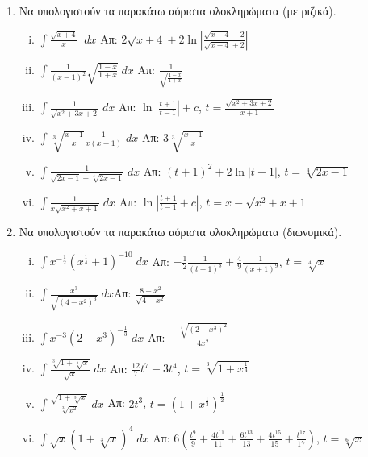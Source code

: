 



\pagestyle{askhseis}
\everymath{\displaystyle}




\begin{center}
  \minibox{\large\bfseries \textcolor{Col1}{Αόριστα Ολοκληρώματα}}
\end{center}

\vspace{\baselineskip}

\begin{enumerate}
\item Να υπολογιστούν τα παρακάτω αόριστα ολοκληρώματα (με ριζικά).
  \begin{enumerate}[i)]
\item $\int\frac{\sqrt{x+4}}{x} \; \; dx$
  \hfill Απ: $2\sqrt{x+4}+2\ln\left|\frac{\sqrt{x+4}-2}{\sqrt{x+4}+2}\right|$
\item $\int\frac{1}{(x-1)^2}\sqrt{\frac{1-x}{1+x}}\; dx$
  \hfill Απ: $\frac{1}{\sqrt{\frac{1-x}{1+x}}}$
\item $\int\frac{1}{\sqrt{x^2+3x+2}}\; dx$
  \hfill Απ: $\ln\left|\frac{t+1}{t-1}\right|+c$, \; $t=\frac{\sqrt{x^2+3x+2}}{x+1}$
\item $\int\sqrt[3]{\frac{x-1}{x}}\frac{1}{x(x-1)}\; dx$
  \hfill Απ: $3\sqrt[3]{\frac{x-1}{x}} $
\item $\int\frac{1}{\sqrt{2x-1}-\sqrt[4]{2x-1}}\; dx$
  \hfill Απ: $(t+1)^2 +2\ln|t-1|$, \; $t=\sqrt[4]{2x-1}$
\item $\int\frac{1}{x\sqrt{x^2+x+1}}\; dx$
  \hfill Απ: $\ln\left|\frac{t+1}{t-1}+c\right|$, \; $t=x-\sqrt{x^2+x+1}$
\end{enumerate}

\item Να υπολογιστούν τα παρακάτω αόριστα ολοκληρώματα (διωνυμικά).
  \begin{enumerate}[i)]
\item $\int x^{-\frac{1}{2}}(x^{\frac{1}{4}}+1)^{-10}\; dx$
  \hfill Απ: $-\frac{1}{2}\frac{1}{(t+1)^8}+\frac{4}{9}\frac{1}{(x+1)^9}$, \; 
  $t=\sqrt[4]{x}$
\item $\int\frac{x^{3}}{\sqrt{(4-x^2)^3}}\; dx$\hfill Απ: $\frac{8-x^2}{\sqrt{4-x^2}}$
\item $\int x^{-3}(2-x^3)^{-\frac{1}{3}} \; dx$
  \hfill Απ: $-\frac{\sqrt[3]{(2-x^3)^2}}{4x^2} $
\item $\int\frac{\sqrt[3]{1+\sqrt[4]{x}}}{\sqrt{x}}\; dx$
  \hfill Απ: $\frac{12}{7}t^7-3t^4$, \; $t=\sqrt[3]{1+x^{\frac{1}{4}}}$
\item $\int \frac{\sqrt{1+\sqrt[3]{x}}}{\sqrt[3]{x^2}}\; dx$
  \hfill Απ: $2t^3$, \; $t=(1+x^{\frac{1}{3}})^{\frac{1}{2}}$
\item $\int\sqrt{x}(1+\sqrt[3]{x})^4\; dx$
  \hfill Απ: $6\left(\frac{t^9}{9}+\frac{4t^{11}}{11}+\frac{6t^{13}}{13}+
    \frac{4t^{15}}{15}+ \frac{t^{17}}{17}\right)$, \; $t=\sqrt[6]{x}$
\end{enumerate}


\end{enumerate}
